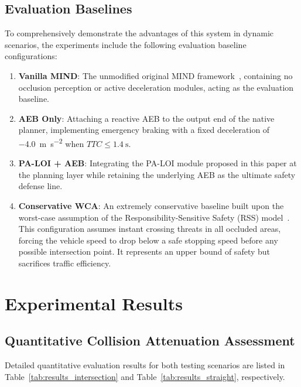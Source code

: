 \documentclass[conference]{IEEEtran}
\begin{document}
\subsection{Evaluation Baselines}
To comprehensively demonstrate the advantages of this system in dynamic scenarios, the experiments include the following evaluation baseline configurations:
\begin{enumerate}
    \item \textbf{Vanilla MIND}: The unmodified original MIND framework~\cite{mind2025}, containing no occlusion perception or active deceleration modules, acting as the evaluation baseline.
    \item \textbf{AEB Only}: Attaching a reactive AEB to the output end of the native planner, implementing emergency braking with a fixed deceleration of \SI{-4.0}{\meter\per\second\squared} when $TTC \leq \SI{1.4}{\second}$.
    \item \textbf{PA-LOI + AEB}: Integrating the PA-LOI module proposed in this paper at the planning layer while retaining the underlying AEB as the ultimate safety defense line.
    \item \textbf{Conservative WCA}: An extremely conservative baseline built upon the worst-case assumption of the Responsibility-Sensitive Safety (RSS) model~\cite{shalev2017rss}. This configuration assumes instant crossing threats in all occluded areas, forcing the vehicle speed to drop below a safe stopping speed before any possible intersection point. It represents an upper bound of safety but sacrifices traffic efficiency.
\end{enumerate}

\section{Experimental Results}

\subsection{Quantitative Collision Attenuation Assessment}
Detailed quantitative evaluation results for both testing scenarios are listed in Table~\ref{tab:results_intersection} and Table~\ref{tab:results_straight}, respectively.
\end{document}
